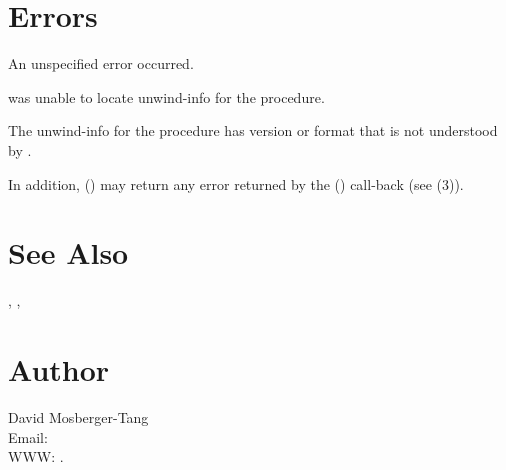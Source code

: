 \documentclass{article}
\begin{document}
\section{Errors}

\begin{Description}
\item[\Const{UNW\_EUNSPEC}] An unspecified error occurred.
\item[\Const{UNW\_ENOINFO}]  was unable to locate
  unwind-info for the procedure.
\item[\Const{UNW\_EBADVERSION}] The unwind-info for the procedure has
  version or format that is not understood by .
\end{Description}
In addition, () may return any error
returned by the () call-back (see
(3)).

\section{See Also}

,
,

\section{Author}

\noindent
David Mosberger-Tang\\
Email: \\
WWW: .
\LatexManEnd
\end{document}
